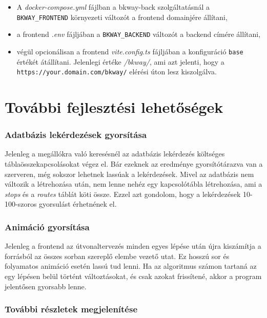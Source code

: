 \begin{itemize}
    \item A \textit{docker-compose.yml} fájlban a bkway-back szolgáltatásnál a \texttt{BKWAY\_FRONTEND} környezeti változót a frontend domainjére állítani,
    \item a frontend \textit{.env} fájljában a \texttt{BKWAY\_BACKEND} változót a backend címére állítani,
    \item végül opcionálisan a frontend \textit{vite.config.ts} fájljában a konfiguráció \texttt{base} értékét átállítani. Jelenlegi értéke \textit{/bkway/}, ami azt jelenti, hogy a \mbox{\texttt{https://your.domain.com/bkway/}} elérési úton lesz kiszolgálva.
\end{itemize}

\section{További fejlesztési lehetőségek}

\subsubsection{Adatbázis lekérdezések gyorsítása}

Jelenleg a megállókra való keresésnél az adatbázis lekérdezés költséges táblaösszekapcsolásokat végez el. Bár ezeknek az eredménye gyorsítótárazva van a szerveren, még sokszor lehetnek lassúak a lekérdezések. Mivel az adatbázis nem változik a létrehozása után, nem lenne nehéz egy kapcsolótábla létrehozása, ami a \textit{stops} és a \textit{routes} táblát köti össze. Ezzel azt gondolom, hogy a lekérdezések 10-100-szoros gyorsulást érhetnének el.

\subsubsection{Animáció gyorsítása}

Jelenleg a frontend az útvonaltervezés minden egyes lépése után újra kiszámítja a forrásból az összes sorban szereplő elembe vezető utat. Ez hosszú sor és folyamatos animáció esetén lassú tud lenni. Ha az algoritmus számon tartaná az egy lépésen belül történt változtásokat, és csak azokat frissítené, akkor a program jelentősen gyorsabb lenne.

\subsubsection{További részletek megjelenítése}

